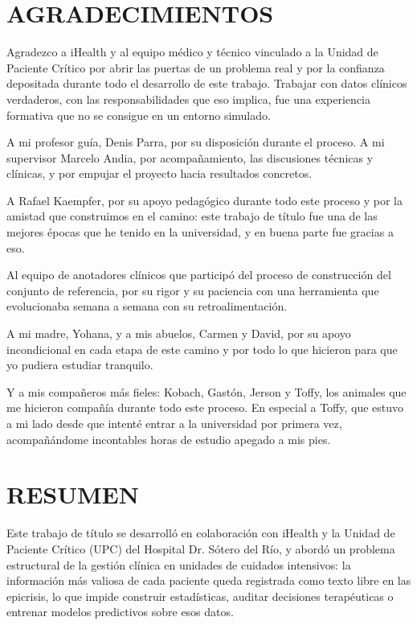 \documentclass[12pt,letterpaper]{article}
\begin{document}
\section*{AGRADECIMIENTOS}

Agradezco a iHealth y al equipo médico y técnico vinculado a la Unidad de Paciente Crítico por abrir las puertas de un problema real y por la confianza depositada durante todo el desarrollo de este trabajo. Trabajar con datos clínicos verdaderos, con las responsabilidades que eso implica, fue una experiencia formativa que no se consigue en un entorno simulado.

A mi profesor guía, Denis Parra, por su disposición durante el proceso. A mi supervisor Marcelo Andia, por acompañamiento, las discusiones técnicas y clínicas, y por empujar el proyecto hacia resultados concretos.

A Rafael Kaempfer, por su apoyo pedagógico durante todo este proceso y por la amistad que construimos en el camino: este trabajo de título fue una de las mejores épocas que he tenido en la universidad, y en buena parte fue gracias a eso.

Al equipo de anotadores clínicos que participó del proceso de construcción del conjunto de referencia, por su rigor y su paciencia con una herramienta que evolucionaba semana a semana con su retroalimentación.

A mi madre, Yohana, y a mis abuelos, Carmen y David, por su apoyo incondicional en cada etapa de este camino y por todo lo que hicieron para que yo pudiera estudiar tranquilo.

Y a mis compañeros más fieles: Kobach, Gastón, Jerson y Toffy, los animales que me hicieron compañía durante todo este proceso. En especial a Toffy, que estuvo a mi lado desde que intenté entrar a la universidad por primera vez, acompañándome incontables horas de estudio apegado a mis pies.
\newpage

\tableofcontents
\newpage
\listoftables
\listoffigures
\newpage

\section*{RESUMEN}

Este trabajo de título se desarrolló en colaboración con iHealth y la Unidad de Paciente Crítico (UPC) del Hospital Dr. Sótero del Río, y abordó un problema estructural de la gestión clínica en unidades de cuidados intensivos: la información más valiosa de cada paciente queda registrada como texto libre en las epicrisis, lo que impide construir estadísticas, auditar decisiones terapéuticas o entrenar modelos predictivos sobre esos datos.
\end{document}
